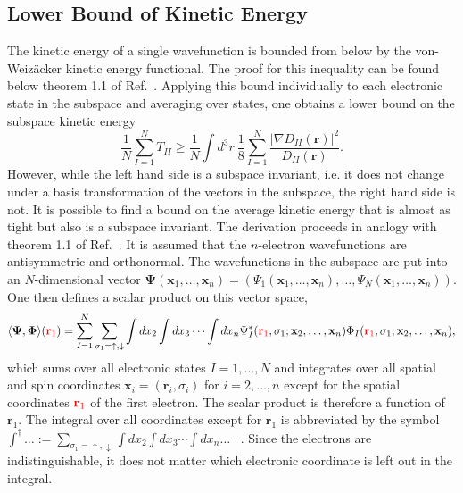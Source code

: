 \documentclass[journal=jacsat,manuscript=article]{achemso}
\renewcommand\vec[1]{\mathbf{#1}}
\begin{document}
\subsection{Lower Bound of Kinetic Energy}
The kinetic energy of a single wavefunction is bounded from below by the von-Weiz\"{a}cker kinetic energy functional.
The proof for this inequality can be found below theorem 1.1 of Ref.~\cite{Lieb2002}. Applying this bound individually
to each electronic state in the subspace and averaging over states, one obtains a lower bound on the subspace kinetic energy 
\begin{equation}
 \frac{1}{N} \sum_{I=1}^{N} T_{II} \ge \frac{1}{N} \int d^3r ~ \frac{1}{8} \sum_{I=1}^{N} \frac{\vert \nabla D_{II}(\vec{r}) \vert^2}{D_{II}(\vec{r})}.
 \label{eqn:lower_bound_kinetic_sum_over_states}
\end{equation}
However, while the left hand side is a subspace invariant, i.e. it does not change under a basis transformation of the vectors in the subspace,
the right hand side is not. It is possible to find a bound on the average kinetic energy that is almost as tight but also is a subspace invariant.
The derivation proceeds in analogy with theorem 1.1 of Ref.~\cite{Lieb2002}. It is assumed that the $n$-electron wavefunctions are antisymmetric and orthonormal.
The wavefunctions in the subspace are put into an $N$-dimensional vector
$\vec{\Psi}(\vec{x}_1,\ldots,\vec{x}_n) = \left(\Psi_1(\vec{x}_1,\ldots,\vec{x}_n), \ldots, \Psi_N(\vec{x}_1,\ldots,\vec{x}_n)\right)$. One then defines
a scalar product on this vector space,
\begin{equation}
\langle \vec{\Psi}, \vec{\Phi} \rangle({\color{red} \vec{r}_1}) = \sum_{I=1}^{N} \sum_{\sigma_1=\uparrow,\downarrow} \int dx_2 \int dx_3 \cdots \int dx_n
  \Psi_I^*({\color{red} \vec{r}_1},\sigma_1;\vec{x}_2,\ldots,\vec{x}_n)
  \Phi_I({\color{red} \vec{r}_1},\sigma_1;\vec{x}_2,\ldots,\vec{x}_n),
\end{equation}
which sums over all electronic states $I=1,\ldots,N$ and integrates over all spatial and spin coordinates $\vec{x}_i = (\vec{r}_i,\sigma_i)$ for $i=2,\ldots,n$
except for the spatial coordinates ${\color{red} \vec{r}_1}$
of the first electron. The scalar product is therefore a function of $\vec{r}_1$. The integral over all coordinates except for $\vec{r}_1$ is abbreviated
by the symbol $\int^{\dagger} \ldots := \sum_{\sigma_1=\uparrow,\downarrow} \int dx_2 \int dx_3 \cdots \int dx_n \ldots$ ~.
Since the electrons are indistinguishable, it does not matter which electronic coordinate is left out in the integral.
\end{document}

